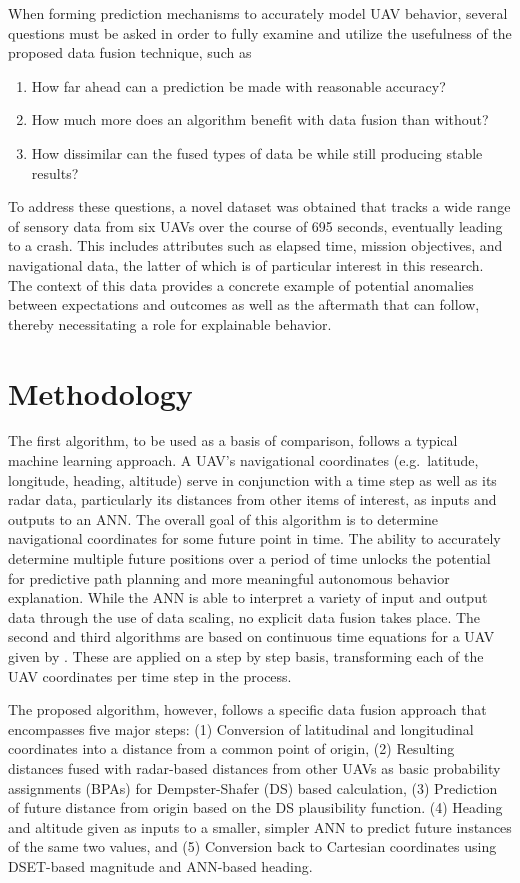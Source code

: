 \documentclass[12pt]{uthesis-v12}  %
\begin{document}
When forming prediction mechanisms to accurately model UAV behavior, several questions must be asked in order to fully examine and utilize the usefulness of the proposed data fusion technique, such as 
\begin{enumerate}
\item How far ahead can a prediction be made with reasonable accuracy? 
\item How much more does an algorithm benefit with data fusion than without? 
\item How dissimilar can the fused types of data be while still producing stable results?
\end{enumerate}
To address these questions, a novel dataset was obtained that tracks a wide range of sensory data from six UAVs over the course of 695 seconds, eventually leading to a crash. This includes attributes such as elapsed time, mission objectives, and navigational data, the latter of which is of particular interest in this research. 
The context of this data provides a concrete example of potential anomalies between expectations and outcomes as well as the aftermath that can follow, thereby necessitating a role for explainable behavior.

\section{Methodology}
\label{method}

The first algorithm, to be used as a basis of comparison, follows a typical machine learning approach.
A UAV's navigational coordinates (e.g.~latitude, longitude, heading, altitude) serve in conjunction with a time step as well as its radar data, particularly its distances from other items of interest, as inputs and outputs to an ANN.
The overall goal of this algorithm is to determine navigational coordinates for some future point in time.
The ability to accurately determine multiple future positions over a period of time unlocks the potential for predictive path planning and more meaningful autonomous behavior explanation.
While the ANN is able to interpret a variety of input and output data through the use of data scaling, no explicit data fusion takes place.
The second and third algorithms are based on continuous time equations for a UAV given by \cite{mao}. These are applied on a step by step basis, transforming each of the UAV coordinates per time step in the process.

The proposed algorithm, however, follows a specific data fusion approach that encompasses five major steps: (1) Conversion of latitudinal and longitudinal coordinates into a distance from a common point of origin,
(2) Resulting distances fused with radar-based distances from other UAVs as basic probability assignments (BPAs) for Dempster-Shafer (DS) based calculation,
(3) Prediction of future distance from origin based on the DS plausibility function. 
(4) Heading and altitude given as inputs to a smaller, simpler ANN to predict future instances of the same two values, and (5) Conversion back to Cartesian coordinates using DSET-based magnitude and ANN-based heading.
\end{document}
